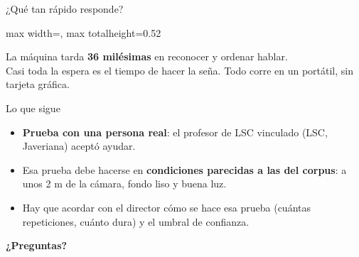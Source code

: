 \documentclass[aspectratio=169,11pt]{beamer}
\newcommand{\idea}[1]{\vfill\begin{center}\large #1\end{center}\vspace{0.2cm}}
\begin{document}
\begin{frame}{¿Qué tan rápido responde?}
  \vspace{0.8cm}
  \begin{center}
  \begin{adjustbox}{max width=\linewidth, max totalheight=0.52\textheight}\end{adjustbox}
  \end{center}
  \idea{La máquina tarda \textbf{36 milésimas} en reconocer y ordenar hablar.\\ Casi toda la espera es el tiempo de hacer la seña. Todo corre en un portátil, sin tarjeta gráfica.}
\end{frame}

\begin{frame}{Lo que sigue}
  \vspace{0.4cm}
  \begin{itemize}\large
    \setlength\itemsep{0.45cm}
    \item \textbf{Prueba con una persona real}: el profesor de LSC vinculado (LSC, Javeriana) aceptó ayudar.
    \item Esa prueba debe hacerse en \textbf{condiciones parecidas a las del corpus}: a unos 2 m de la cámara, fondo liso y buena luz.
    \item Hay que acordar con el director cómo se hace esa prueba (cuántas repeticiones, cuánto dura) y el umbral de confianza.
  \end{itemize}
  \vfill
  \begin{center}\Large\color{azul}\textbf{¿Preguntas?}\end{center}
  \vspace{0.3cm}
\end{frame}
\end{document}
